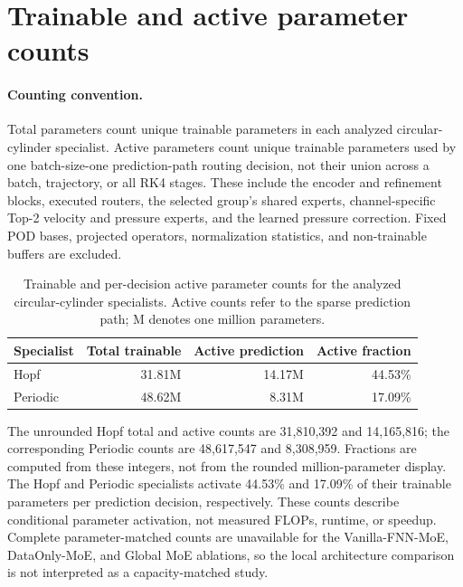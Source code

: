 \section{Trainable and active parameter counts}
\label{app:parameter_counts}

\paragraph{Counting convention.}
Total parameters count unique trainable parameters in each analyzed
circular-cylinder specialist. Active parameters count unique trainable
parameters used by one batch-size-one prediction-path routing decision,
not their union across a batch, trajectory, or all RK4 stages. These include
the encoder and refinement blocks, executed routers, the selected group's
shared experts, channel-specific Top-2 velocity and pressure experts, and
the learned pressure correction. Fixed POD bases, projected operators,
normalization statistics, and non-trainable buffers are excluded.

\par
\begin{table}[H]
\centering
\caption{Trainable and per-decision active parameter counts for the analyzed
circular-cylinder specialists. Active counts refer to the sparse prediction
path; M denotes one million parameters.}
\label{tab:parameter_counts}
\begin{tabular}{lrrr}
\toprule
Specialist & Total trainable & Active prediction & Active fraction \\
\midrule
Hopf & 31.81M & 14.17M & 44.53\% \\
Periodic & 48.62M & 8.31M & 17.09\% \\
\bottomrule
\end{tabular}
\end{table}
\par

The unrounded Hopf total and active counts are 31,810,392 and 14,165,816; the corresponding Periodic counts are 48,617,547 and 8,308,959. Fractions are computed from these integers, not from the rounded million-parameter display.
The Hopf and Periodic specialists activate 44.53\% and 17.09\% of their
trainable parameters per prediction decision, respectively. These counts
describe conditional parameter activation, not measured FLOPs, runtime,
or speedup. Complete parameter-matched counts are unavailable for the
Vanilla-FNN-MoE, DataOnly-MoE, and Global MoE ablations, so the local
architecture comparison is not interpreted as a capacity-matched study.

